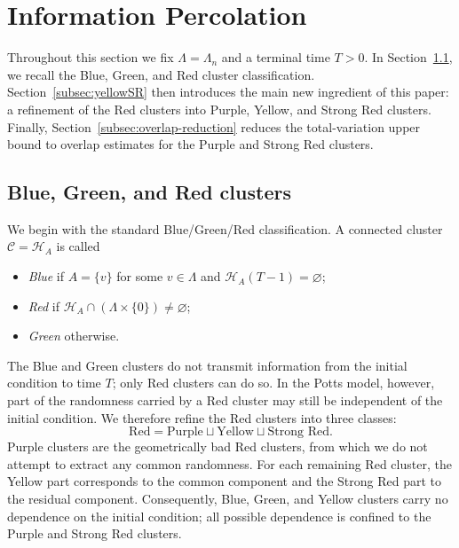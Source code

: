 \documentclass[letterpaper,11pt,reqno]{amsart}
\theoremstyle{definition}
\begin{document}
\medskip
\section{Information Percolation}\label{sec:IP}

Throughout this section we fix \(\Lambda=\Lambda_n\) and a terminal time \(T>0\).
%
In Section~\ref{subsec:BGR}, we recall the Blue, Green, and Red cluster
classification. Section~\ref{subsec:yellowSR} then introduces the main new
ingredient of this paper: a refinement of the Red clusters into Purple, Yellow,
and Strong Red clusters. Finally, Section~\ref{subsec:overlap-reduction} reduces
the total-variation upper bound to overlap estimates for the Purple and Strong
Red clusters.

\subsection{Blue, Green, and Red clusters}\label{subsec:BGR}

We begin with the standard Blue/Green/Red classification. A connected cluster
\(\mathcal C=\mathcal H_A\) is called

\begin{itemize}
\item \emph{Blue} if \(A=\{v\}\) for some \(v\in\Lambda\) and
    \(\mathcal H_A(T-1)=\varnothing\);
\item \emph{Red} if
    \(\mathcal H_A\cap(\Lambda\times\{0\})\neq\varnothing\);
\item \emph{Green} otherwise.
\end{itemize}
The Blue and Green clusters do not transmit information from the initial condition to time \(T\); only Red clusters can do so. In the Potts model,
however, part of the randomness carried by a Red cluster may still be independent of the initial condition. We therefore refine the Red clusters into three classes:
\[
\text{Red}=\text{Purple}\sqcup\text{Yellow}\sqcup\text{Strong Red}.
\]
Purple clusters are the geometrically bad Red clusters, from which we do not
attempt to extract any common randomness. For each remaining Red cluster, the
Yellow part corresponds to the common component and the Strong Red part to the
residual component. Consequently, Blue, Green, and Yellow clusters carry no
dependence on the initial condition; all possible dependence is confined to the
Purple and Strong Red clusters.
\end{document}
